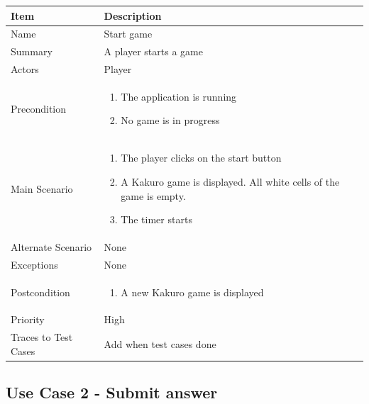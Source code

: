 \documentclass[12pt]{article}
\begin{document}
\begin{center}
\setlength{\tabcolsep}{18pt}
\renewcommand{\arraystretch}{1.1}
\begin{tabular}{ |p{3.4cm}|p{10cm}| }
    \hline
    \textbf{Item} & \textbf{Description} \\
    \hline
    Name & Start game \\
    \hline
    Summary & A player starts a game \\
    \hline
    Actors & Player \\
    \hline
    Precondition &  
    \vspace*{-0.1in}
    \begin{enumerate}[leftmargin=0.2in]
    \item The application is running
    \item No game is in progress
    \end{enumerate}  \\
    \hline
    Main Scenario &     
    \vspace*{-0.1in}
    \begin{enumerate}[leftmargin=0.2in]
    \item The player clicks on the start button
    \item A Kakuro game is displayed. All white cells of the game is empty.
    \item The timer starts
    \end{enumerate}  \\
    \hline
    Alternate Scenario & None  \\
    \hline
    Exceptions & None \\
    \hline
    Postcondition & 
    \vspace*{-0.1in}
    \begin{enumerate}[leftmargin=0.2in]
    \item A new Kakuro game is displayed 
    \end{enumerate}  \\
    \hline
    Priority & High  \\
    \hline
    Traces to Test Cases & Add when test cases done  \\
    \hline
\end{tabular}
\end{center}

\newpage


\subsection{Use Case 2 - Submit answer}
\end{document}
